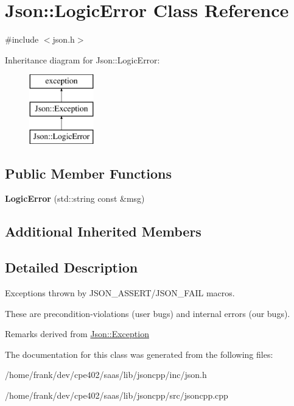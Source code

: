 \hypertarget{class_json_1_1_logic_error}{}\section{Json\+:\+:Logic\+Error Class Reference}
\label{class_json_1_1_logic_error}


{\ttfamily \#include $<$json.\+h$>$}

Inheritance diagram for Json\+:\+:Logic\+Error\+:\begin{figure}[H]
\begin{center}
\leavevmode
\includegraphics[height=3.000000cm]{class_json_1_1_logic_error}
\end{center}
\end{figure}
\subsection*{Public Member Functions}
\begin{DoxyCompactItemize}
\item 
\hypertarget{class_json_1_1_logic_error_ae8a834c790017a55df74c70b91f23329}{}{\bfseries Logic\+Error} (std\+::string const \&msg)\label{class_json_1_1_logic_error_ae8a834c790017a55df74c70b91f23329}

\end{DoxyCompactItemize}
\subsection*{Additional Inherited Members}


\subsection{Detailed Description}
Exceptions thrown by J\+S\+O\+N\+\_\+\+A\+S\+S\+E\+R\+T/\+J\+S\+O\+N\+\_\+\+F\+A\+I\+L macros.

These are precondition-\/violations (user bugs) and internal errors (our bugs).

\begin{DoxyRemark}{Remarks}
derived from \hyperlink{class_json_1_1_exception}{Json\+::\+Exception} 
\end{DoxyRemark}


The documentation for this class was generated from the following files\+:\begin{DoxyCompactItemize}
\item 
/home/frank/dev/cpe402/saas/lib/jsoncpp/inc/json.\+h\item 
/home/frank/dev/cpe402/saas/lib/jsoncpp/src/jsoncpp.\+cpp\end{DoxyCompactItemize}
